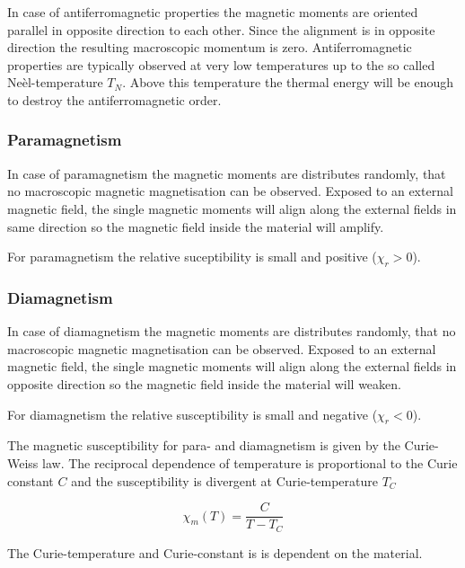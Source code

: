 \documentclass[paper=a4, fontsize=10pt]{scrartcl}
\begin{document}
In case of antiferromagnetic properties the magnetic moments are
oriented parallel in opposite direction to each other. Since the
alignment is in opposite direction the resulting macroscopic momentum
is zero. Antiferromagnetic properties are typically observed at very
low temperatures up to the so called Neèl-temperature $T_N$. Above
this temperature the thermal energy will be enough to destroy the
antiferromagnetic order.


\subsubsection*{Paramagnetism}

In case of paramagnetism the magnetic moments are distributes
randomly, that no macroscopic magnetic magnetisation can be observed.
Exposed to an external magnetic field, the single magnetic moments
will align along the external fields in same direction so the magnetic
field inside the material will amplify.


For paramagnetism the relative suceptibility is small and positive
($\chi_r>0$).


\subsubsection*{Diamagnetism}

In case of diamagnetism the magnetic moments are distributes randomly,
that no macroscopic magnetic magnetisation can be observed. Exposed to
an external magnetic field, the single magnetic moments will align
along the external fields in opposite direction so the magnetic field
inside the material will weaken.


For diamagnetism the relative susceptibility is small and negative
($\chi_r<0$).

The magnetic susceptibility for para- and diamagnetism is given by the
Curie-Weiss law. The reciprocal dependence of temperature is
proportional to the Curie constant $C$ and the susceptibility is
divergent at Curie-temperature $T_C$

$$\chi_m(T)=\frac{C}{T-T_C}$$

The Curie-temperature and Curie-constant is is dependent on the
material.




\end{document}
